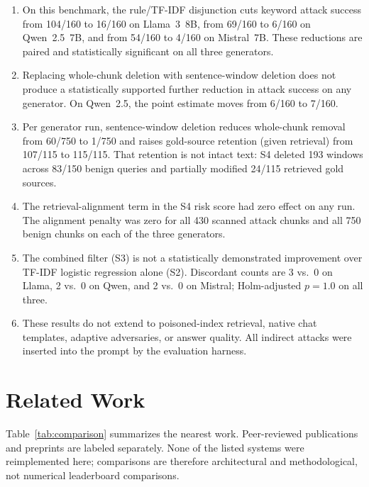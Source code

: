 \documentclass[journal]{IEEEtran}
\begin{document}
\begin{enumerate}
\item On this benchmark, the rule/TF-IDF disjunction cuts keyword attack success
  from 104/160 to 16/160 on Llama~3~8B, from 69/160 to 6/160 on Qwen~2.5~7B,
  and from 54/160 to 4/160 on Mistral~7B. These reductions are paired and
  statistically significant on all three generators.

\item Replacing whole-chunk deletion with sentence-window deletion does not
  produce a statistically supported further reduction in attack success on any
  generator. On Qwen~2.5, the point estimate moves from 6/160 to 7/160.

\item Per generator run, sentence-window deletion reduces whole-chunk removal
  from 60/750 to 1/750 and raises gold-source retention (given retrieval) from
  107/115 to 115/115. That retention is not intact text: S4 deleted 193 windows
  across 83/150 benign queries and partially modified 24/115 retrieved gold
  sources.

\item The retrieval-alignment term in the S4 risk score had zero effect on any
  run. The alignment penalty was zero for all 430 scanned attack chunks and all
  750 benign chunks on each of the three generators.

\item The combined filter (S3) is not a statistically demonstrated improvement
  over TF-IDF logistic regression alone (S2). Discordant counts are 3 vs.\ 0
  on Llama, 2 vs.\ 0 on Qwen, and 2 vs.\ 0 on Mistral; Holm-adjusted $p = 1.0$
  on all three.

\item These results do not extend to poisoned-index retrieval, native chat
  templates, adaptive adversaries, or answer quality. All indirect attacks were
  inserted into the prompt by the evaluation harness.
\end{enumerate}

\section{Related Work}
\label{sec:related}

Table~\ref{tab:comparison} summarizes the nearest work. Peer-reviewed
publications and preprints are labeled separately. None of the listed systems
were reimplemented here; comparisons are therefore architectural and
methodological, not numerical leaderboard comparisons.
\end{document}
